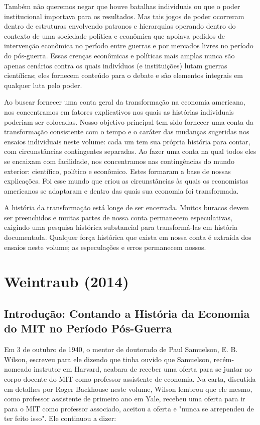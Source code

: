\documentclass[12pt]{article}
\begin{document}
Também não queremos negar que houve batalhas individuais ou que o poder institucional importava para os resultados. Mas tais jogos de poder ocorreram dentro de estruturas envolvendo patronos e hierarquias operando dentro do contexto de uma sociedade política e econômica que apoiava pedidos de intervenção econômica no período entre guerras e por mercados livres no período do pós-guerra. Essas crenças econômicas e políticas mais amplas nunca são apenas cenários contra os quais indivíduos (e instituições) lutam guerras científicas; eles fornecem conteúdo para o debate e são elementos integrais em qualquer luta pelo poder.

Ao buscar fornecer uma conta geral da transformação na economia americana, nos concentramos em fatores explicativos nos quais as histórias individuais poderiam ser colocadas. Nosso objetivo principal tem sido fornecer uma conta da transformação consistente com o tempo e o caráter das mudanças sugeridas nos ensaios individuais neste volume: cada um tem sua própria história para contar, com circunstâncias contingentes separadas. Ao fazer uma conta na qual todos eles se encaixam com facilidade, nos concentramos nas contingências do mundo exterior: científico, político e econômico. Estes formaram a base de nossas explicações. Foi esse mundo que criou as circunstâncias às quais os economistas americanos se adaptaram e dentro das quais sua economia foi transformada.

A história da transformação está longe de ser encerrada. Muitos buracos devem ser preenchidos e muitas partes de nossa conta permanecem especulativas, exigindo uma pesquisa histórica substancial para transformá-las em história documentada. Qualquer força histórica que exista em nossa conta é extraída dos ensaios neste volume; as especulações e erros permanecem nossos.

\section{\textbf{Weintraub (2014)}}
\subsection{\textbf{Introdução: Contando a História da Economia do MIT no Período Pós-Guerra}}
Em 3 de outubro de 1940, o mentor de doutorado de Paul Samuelson, E. B. Wilson, escreveu para ele dizendo que tinha ouvido que Samuelson, recém-nomeado instrutor em Harvard, acabara de receber uma oferta para se juntar ao corpo docente do MIT como professor assistente de economia. Na carta, discutida em detalhes por Roger Backhouse neste volume, Wilson lembrou que ele mesmo, como professor assistente de primeiro ano em Yale, recebeu uma oferta para ir para o MIT como professor associado, aceitou a oferta e "nunca se arrependeu de ter feito isso". Ele continuou a dizer:
\end{document}
